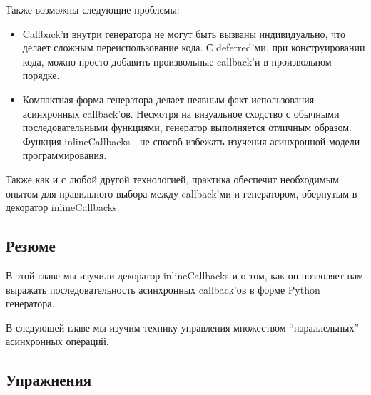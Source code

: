 Также возможны следующие проблемы:

\begin{itemize}

\item Callback'и внутри генератора не могут быть вызваны 
    индивидуально, что делает сложным переиспользование 
    кода. С deferred'ми, при конструировании кода, можно  
    просто добавить произвольные callback'и в 
    произвольном порядке.



\item Компактная форма генератора делает неявным 
    факт использования асинхронных callback'ов. Несмотря на 
    визуальное сходство с обычными последовательными 
    функциями, генератор выполняется отличным образом. 
    Функция inlineCallbacks - не способ избежать 
    изучения асинхронной модели программирования.

\end{itemize}


Также как и с любой другой технологией, 
практика обеспечит необходимым опытом для правильного выбора между 
callback'ми и генератором, обернутым в декоратор inlineCallbacks.


\subsection{Резюме}

В этой главе мы изучили декоратор inlineCallbacks и о том, как 
он позволяет нам выражать последовательность 
асинхронных callback'ов в форме Python генератора.


В следующей главе мы изучим технику управления 
множеством ``параллельных'' асинхронных операций.


\subsection{Упражнения}

